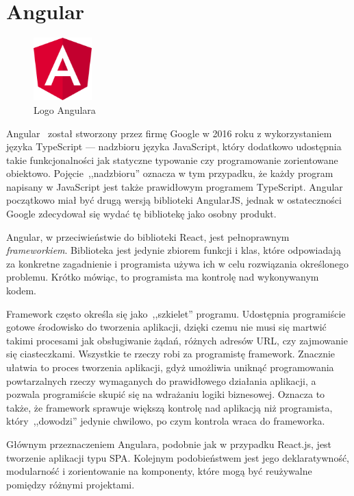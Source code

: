 \documentclass[twoside,a4paper]{report}
\begin{document}
\section{Angular}
\begin{figure}
    \centering
    \includegraphics[width=0.2\textwidth]{img/logo_angular.png}
    \caption*{Logo Angulara}\label{fig:logo_angular}
\end{figure}
Angular~\cite{angulardocs} został stworzony przez firmę Google w 2016 roku z wykorzystaniem języka TypeScript --- nadzbioru języka JavaScript, który dodatkowo udostępnia takie funkcjonalności jak statyczne typowanie czy programowanie zorientowane obiektowo.
Pojęcie~,,nadzbioru'' oznacza w tym przypadku, że każdy program napisany w JavaScript jest także prawidłowym programem TypeScript.
Angular początkowo miał być drugą wersją biblioteki AngularJS, jednak w ostateczności Google zdecydował się wydać tę bibliotekę jako osobny produkt.

Angular, w przeciwieństwie do biblioteki React, jest pełnoprawnym \textit{frameworkiem}.
Biblioteka jest jedynie zbiorem funkcji i klas, które odpowiadają za konkretne zagadnienie i programista używa ich w celu rozwiązania określonego problemu.
Krótko mówiąc, to programista ma kontrolę nad wykonywanym kodem.

Framework często określa się jako~,,szkielet'' programu.
Udostępnia programiście gotowe środowisko do tworzenia aplikacji, dzięki czemu nie musi się martwić takimi procesami jak obsługiwanie żądań, różnych adresów URL, czy zajmowanie się ciasteczkami.
Wszystkie te rzeczy robi za programistę framework.
Znacznie ułatwia to proces tworzenia aplikacji, gdyż umożliwia uniknąć programowania powtarzalnych rzeczy wymaganych do prawidłowego działania aplikacji, a pozwala programiście skupić się na wdrażaniu logiki biznesowej.
Oznacza to także, że framework sprawuje większą kontrolę nad aplikacją niż programista, który~,,dowodzi'' jedynie chwilowo, po czym kontrola wraca do frameworka.

Głównym przeznaczeniem Angulara, podobnie jak w przypadku React.js, jest tworzenie aplikacji typu SPA\@.
Kolejnym podobieństwem jest jego deklaratywność, modularność i zorientowanie na komponenty, które mogą być reużywalne pomiędzy różnymi projektami.
\end{document}

